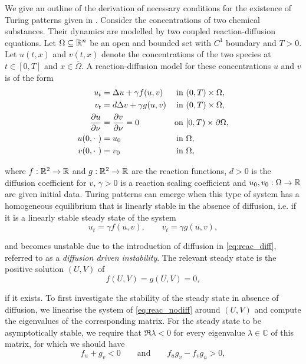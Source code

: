 We give an outline of the derivation of necessary conditions for the existence of Turing patterns given in \cite{murray03}. Consider the concentrations of two chemical substances. Their dynamics are modelled by two coupled reaction-diffusion equations. Let $\Omega \subseteq \R^n$ be an open and bounded set with $C^1$ boundary and $T > 0$. Let $u(t, x)$ and $v(t, x)$ denote the concentrations of the two species at $t \in [0, T]$ and $x \in \overline{\Omega}$. A reaction-diffusion model for these concentrations $u$ and $v$ is of the form
%
\begin{equation}
    \label{eq:reac_diff}
    \begin{aligned}
        u_t &= \Delta u + \gamma f(u, v) & \text{in } &(0, T) \times \Omega, \\
        v_t &= d \Delta v + \gamma g(u, v) & \text{in } &(0, T) \times \Omega, \\
        \pderiv[u]{\nu} &= \pderiv[v]{\nu} = 0 & \text{on } &[0, T) \times \partial \Omega, \\
        u(0, \cdot\ ) &= u_0 & \text{in } &\Omega, \\
        v(0, \cdot\ ) &= v_0 & \text{in } &\Omega,
    \end{aligned}
\end{equation}

\noindent
where $f: \R^2 \to \R$ and $g: \R^2 \to \R$ are the reaction functions, $d > 0$ is the diffusion coefficient for $v$, $\gamma > 0$ is a reaction scaling coefficient and $u_0, v_0: \Omega \to \R$ are given initial data. Turing patterns can emerge when this type of system has a homogeneous equilibrium that is linearly stable in the absence of diffusion, i.e. if it is a linearly stable steady state of the system
%
\begin{equation}
    \label{eq:reac_nodiff}
    u_t = \gamma f(u, v), \qquad v_t = \gamma g(u, v),
\end{equation}

\noindent
and becomes unstable due to the introduction of diffusion in \cref{eq:reac_diff}, referred to as a \emph{diffusion driven instability}. The relevant steady state is the positive solution $(U, V)$ of
%
\begin{equation*}
    f(U, V) = g(U, V) = 0,
\end{equation*}

\noindent
if it exists. To first investigate the stability of the steady state in absence of diffusion, we linearise the system of \cref{eq:reac_nodiff} around $(U, V)$ and compute the eigenvalues of the corresponding matrix. For the steady state to be asymptotically stable, we require that $\Re{\lambda} < 0$ for every eigenvalue $\lambda \in \mathbb{C}$ of this matrix, for which we should have
%
\begin{equation}
    \label{eq:pattern_conds_1}
    f_u + g_v < 0 \qquad \text{and} \qquad f_u g_v - f_v g_u > 0,
\end{equation}

